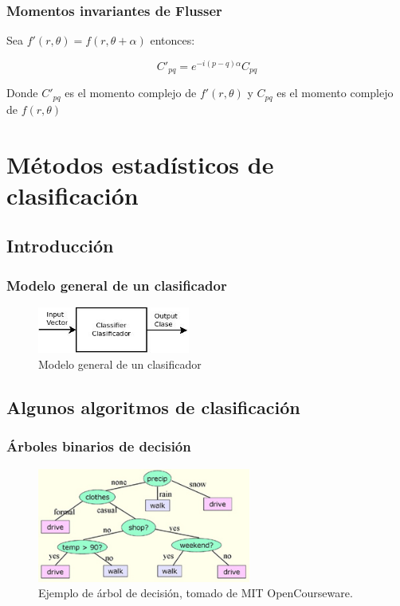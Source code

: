\documentclass{beamer}
\begin{document}
	\begin{frame}
	\frametitle{Momentos invariantes de Flusser}
	Sea $f'(r,\theta) = f(r,\theta+\alpha)$ entonces:

	\begin{equation}\label{eq:rotProp}
		C'_{pq} = e^{-i(p-q)\alpha}C_{pq}
	\end{equation}

	Donde $C'_{pq}$ es el momento complejo de $f'(r,\theta)$ y $C_{pq}$ es el momento complejo de $f(r,\theta)$
	\end{frame}
	
	
	\section{Métodos estadísticos de clasificación}
	
	\subsection{Introducción}
	\begin{frame}
	\frametitle{Modelo general de un clasificador}
	\begin{figure}[htb]
	\begin{center}
	\leavevmode
	\includegraphics[width=5cm]{diagrams/classifier1.jpg}
	\end{center}
	\caption{Modelo general de un clasificador}
	\label{fig:classif1}
	\end{figure}
	\end{frame}
	
	\subsection{Algunos algoritmos de clasificación}
	
	\begin{frame}
	\frametitle{Árboles binarios de decisión}
	\begin{figure}[htb]
	\begin{center}
	\leavevmode
	\includegraphics[width=7cm]{img/decisiontree.jpg}
	\end{center}
	\caption{Ejemplo de árbol de decisión, tomado de MIT OpenCourseware.}
	\label{fig:decisionTree}
	\end{figure}
	\end{frame}
	
\end{document}
